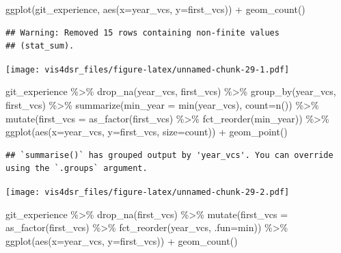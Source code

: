\documentclass[
]{krantz}
\makeatletter
\newenvironment{Shaded}{\begin{snugshade}}{\end{snugshade}}
\newcommand{\AttributeTok}[1]{\textcolor[rgb]{0.61,0.61,0.61}{#1}}
\newcommand{\FunctionTok}[1]{\textcolor[rgb]{0,0,0}{#1}}
\newcommand{\NormalTok}[1]{#1}
\newcommand{\SpecialCharTok}[1]{\textcolor[rgb]{0,0,0}{#1}}
\newenvironment{kframe}{%
\medskip{}
\setlength{\fboxsep}{.8em}
 \def\at@end@of@kframe{}%
 \ifinner\ifhmode%
  \def\at@end@of@kframe{\end{minipage}}%
  \begin{minipage}{\columnwidth}%
 \fi\fi%
 \def\FrameCommand##1{\hskip\@totalleftmargin \hskip-\fboxsep
 \colorbox{shadecolor}{##1}\hskip-\fboxsep
     \hskip-\linewidth \hskip-\@totalleftmargin \hskip\columnwidth}%
 \MakeFramed {\advance\hsize-\width
   \@totalleftmargin\z@ \linewidth\hsize
   \@setminipage}}%
 {\par\unskip\endMakeFramed%
 \at@end@of@kframe}
\renewenvironment{Shaded}{\begin{kframe}}{\end{kframe}}
\makeatother
\begin{document}
\begin{Shaded}
\begin{Highlighting}[]
\FunctionTok{ggplot}\NormalTok{(git\_experience, }\FunctionTok{aes}\NormalTok{(}\AttributeTok{x=}\NormalTok{year\_vcs, }\AttributeTok{y=}\NormalTok{first\_vcs)) }\SpecialCharTok{+}
  \FunctionTok{geom\_count}\NormalTok{()}
\end{Highlighting}
\end{Shaded}

\begin{verbatim}
## Warning: Removed 15 rows containing non-finite values
## (stat_sum).
\end{verbatim}

\texttt{[image: vis4dsr\_files/figure-latex/unnamed-chunk-29-1.pdf]}

\begin{Shaded}
\begin{Highlighting}[]
\NormalTok{git\_experience }\SpecialCharTok{\%\textgreater{}\%}
  \FunctionTok{drop\_na}\NormalTok{(year\_vcs, first\_vcs) }\SpecialCharTok{\%\textgreater{}\%}
  \FunctionTok{group\_by}\NormalTok{(year\_vcs, first\_vcs) }\SpecialCharTok{\%\textgreater{}\%}
  \FunctionTok{summarize}\NormalTok{(}\AttributeTok{min\_year =} \FunctionTok{min}\NormalTok{(year\_vcs),}
            \AttributeTok{count=}\FunctionTok{n}\NormalTok{()) }\SpecialCharTok{\%\textgreater{}\%}
  \FunctionTok{mutate}\NormalTok{(}\AttributeTok{first\_vcs =} \FunctionTok{as\_factor}\NormalTok{(first\_vcs) }\SpecialCharTok{\%\textgreater{}\%} 
           \FunctionTok{fct\_reorder}\NormalTok{(min\_year)) }\SpecialCharTok{\%\textgreater{}\%}
  \FunctionTok{ggplot}\NormalTok{(}\FunctionTok{aes}\NormalTok{(}\AttributeTok{x=}\NormalTok{year\_vcs, }\AttributeTok{y=}\NormalTok{first\_vcs, }\AttributeTok{size=}\NormalTok{count)) }\SpecialCharTok{+}
  \FunctionTok{geom\_point}\NormalTok{()}
\end{Highlighting}
\end{Shaded}

\begin{verbatim}
## `summarise()` has grouped output by 'year_vcs'. You can override using the `.groups` argument.
\end{verbatim}

\texttt{[image: vis4dsr\_files/figure-latex/unnamed-chunk-29-2.pdf]}

\begin{Shaded}
\begin{Highlighting}[]
\NormalTok{git\_experience }\SpecialCharTok{\%\textgreater{}\%}
  \FunctionTok{drop\_na}\NormalTok{(first\_vcs) }\SpecialCharTok{\%\textgreater{}\%}
  \FunctionTok{mutate}\NormalTok{(}\AttributeTok{first\_vcs =} \FunctionTok{as\_factor}\NormalTok{(first\_vcs) }\SpecialCharTok{\%\textgreater{}\%} 
           \FunctionTok{fct\_reorder}\NormalTok{(year\_vcs, }\AttributeTok{.fun=}\NormalTok{min)) }\SpecialCharTok{\%\textgreater{}\%}
  \FunctionTok{ggplot}\NormalTok{(}\FunctionTok{aes}\NormalTok{(}\AttributeTok{x=}\NormalTok{year\_vcs, }\AttributeTok{y=}\NormalTok{first\_vcs)) }\SpecialCharTok{+}
  \FunctionTok{geom\_count}\NormalTok{()}
\end{Highlighting}
\end{Shaded}
\end{document}
